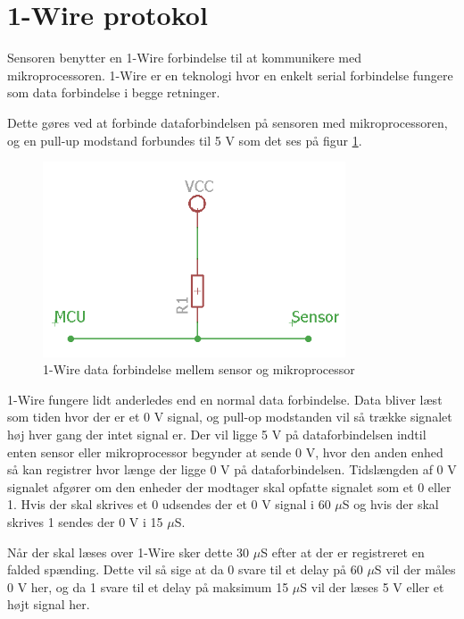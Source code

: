 \section{1-Wire protokol}
Sensoren benytter en 1-Wire forbindelse til at kommunikere med mikroprocessoren. 1-Wire er en teknologi hvor en  enkelt serial forbindelse fungere som data forbindelse i begge retninger. 

Dette gøres ved at forbinde dataforbindelsen på sensoren med mikroprocessoren, og en pull-up modstand forbundes til 5 V som det ses på figur \ref{one_wire_schematic}. 


\begin{figure}[h!]
  \centering
  \includegraphics[width=0.8\textwidth]{figures/onewire_eksempel.png}
  \caption{1-Wire data forbindelse mellem sensor og mikroprocessor}
  \label{one_wire_schematic}
\end{figure}

1-Wire fungere lidt anderledes end en normal data forbindelse. Data bliver læst som tiden hvor der er et 0 V signal, og pull-op modstanden vil så trække signalet høj hver gang der intet signal er. Der vil ligge 5 V på dataforbindelsen indtil enten sensor eller mikroprocessor begynder at sende 0 V, hvor den anden enhed så kan registrer hvor længe der ligge 0 V på dataforbindelsen. Tidslængden af 0 V signalet afgører om den enheder der modtager skal opfatte signalet som et 0 eller 1. Hvis der skal skrives et 0 udsendes der et 0 V signal i 60 $\mu$S og hvis der skal skrives 1 sendes der 0 V i 15 $\mu$S. 

Når der skal læses over 1-Wire sker dette 30 $\mu$S efter at der er registreret en falded spænding. Dette vil så sige at da 0 svare til et delay på 60 $\mu$S vil der måles 0 V her, og da 1 svare til et delay på maksimum 15 $\mu$S vil der læses 5 V eller et højt signal her.


